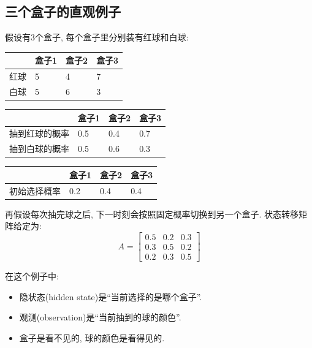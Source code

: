 \subsection{三个盒子的直观例子}


假设有$3$个盒子, 每个盒子里分别装有红球和白球:

\begin{table}[H]
\centering
\begingroup
\setlength{\tabcolsep}{2pt}
\small
\begin{tabular}{|p{}|p{}|p{}|p{}|}
\hline
 & 盒子1 & 盒子2 & 盒子3 \\ \hline
红球 & 5 & 4 & 7 \\ \hline
白球 & 5 & 6 & 3 \\ \hline
\end{tabular}
\endgroup
\end{table}
\begin{table}[H]
\centering
\begingroup
\setlength{\tabcolsep}{2pt}
\small
\begin{tabular}{|p{}|p{}|p{}|p{}|}
\hline
 & 盒子1 & 盒子2 & 盒子3 \\ \hline
抽到红球的概率 & 0.5 & 0.4 & 0.7 \\ \hline
抽到白球的概率 & 0.5 & 0.6 & 0.3 \\ \hline
\end{tabular}
\endgroup
\end{table}
\begin{table}[H]
\centering
\begingroup
\setlength{\tabcolsep}{2pt}
\small
\begin{tabular}{|p{}|p{}|p{}|p{}|}
\hline
 & 盒子1 & 盒子2 & 盒子3 \\ \hline
初始选择概率 & 0.2 & 0.4 & 0.4 \\ \hline
\end{tabular}
\endgroup
\end{table}

再假设每次抽完球之后, 下一时刻会按照固定概率切换到另一个盒子.
状态转移矩阵给定为:
\[
A = \begin{bmatrix}0.5 & 0.2 & 0.3 \\ 0.3 & 0.5 & 0.2 \\ 0.2 & 0.3 & 0.5\end{bmatrix}
\]

在这个例子中:

\begin{itemize}
\item 隐状态(hidden state)是“当前选择的是哪个盒子”.
\item 观测(observation)是“当前抽到的球的颜色”.
\item 盒子是看不见的, 球的颜色是看得见的.
\end{itemize}

